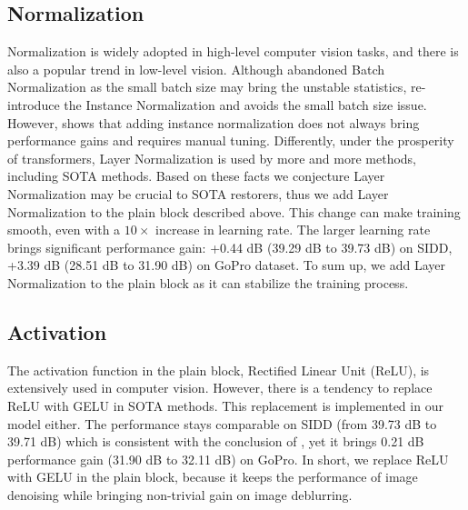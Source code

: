 \documentclass[runningheads]{llncs}
\begin{document}
\subsection{Normalization}
Normalization is widely adopted in high-level computer vision tasks, and there is also a popular trend in low-level vision. 
Although \cite{nah2017deep} abandoned Batch Normalization\cite{ioffe2015batch} as the small batch size may bring the unstable statistics\cite{yan2020towards}, \cite{chen2021hinet} re-introduce the Instance Normalization\cite{ulyanov2016instance} and avoids the small batch size issue. However, \cite{chen2021hinet} shows that adding instance normalization does not always bring performance gains and requires manual tuning. Differently, under the prosperity of transformers, Layer Normalization\cite{ba2016layer} is used by more and more methods, including SOTA methods\cite{tu2022maxim,zamir2021restormer,wang2021uformer,liu2022convnet,liu2021swin}. Based on these facts we conjecture Layer Normalization may be crucial to SOTA restorers, thus we add Layer Normalization to the plain block described above. This change can make training smooth, even with a $10\times$ increase in learning rate. The larger learning rate brings significant performance gain: +0.44 dB (39.29 dB to 39.73 dB) on SIDD\cite{SIDD_2018_CVPR}, +3.39 dB (28.51 dB to 31.90 dB) on GoPro\cite{nah2017deep} dataset. To sum up, we add Layer Normalization to the plain block as it can stabilize the training process.



\subsection{Activation}
The activation function in the plain block, Rectified Linear Unit\cite{nair2010rectified} (ReLU), is extensively used in computer vision. However, there is a tendency to replace ReLU with GELU\cite{hendrycks2016gaussian} in SOTA methods\cite{liu2022convnet,zamir2021restormer,tu2022maxim,liu2021swin,dosovitskiy2020image}. 
This replacement is implemented in our model either. The performance stays comparable on SIDD (from 39.73 dB to 39.71 dB) which is consistent with the conclusion of \cite{liu2022convnet}, yet it brings 0.21 dB performance gain (31.90 dB to 32.11 dB) on GoPro. In short, we replace ReLU with GELU in the plain block, because it keeps the performance of image denoising while bringing non-trivial gain on image deblurring.
\end{document}
